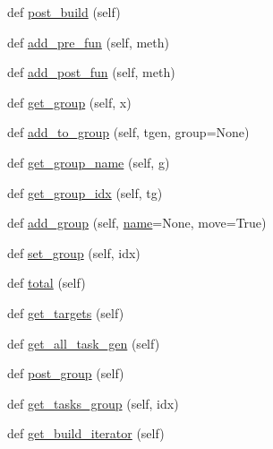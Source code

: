 \begin{DoxyCompactItemize}
\item 
def \hyperlink{classwaflib_1_1_build_1_1_build_context_aa8a25dd6bc5b621fa21d9806525e03df}{post\+\_\+build} (self)
\item 
def \hyperlink{classwaflib_1_1_build_1_1_build_context_a6ebf18db9a2bccd92de1506d261d7f03}{add\+\_\+pre\+\_\+fun} (self, meth)
\item 
def \hyperlink{classwaflib_1_1_build_1_1_build_context_a64d6fb9f73868bc70922fabaa0682fef}{add\+\_\+post\+\_\+fun} (self, meth)
\item 
def \hyperlink{classwaflib_1_1_build_1_1_build_context_ae9d4d76df236217e6c1ba262df1a7376}{get\+\_\+group} (self, x)
\item 
def \hyperlink{classwaflib_1_1_build_1_1_build_context_a4454ed8386bb714afcd240eedc360720}{add\+\_\+to\+\_\+group} (self, tgen, group=None)
\item 
def \hyperlink{classwaflib_1_1_build_1_1_build_context_a70172b57dd578379f3de337a479d1463}{get\+\_\+group\+\_\+name} (self, g)
\item 
def \hyperlink{classwaflib_1_1_build_1_1_build_context_a8b0e6338acd281989d32dd8a1502e745}{get\+\_\+group\+\_\+idx} (self, tg)
\item 
def \hyperlink{classwaflib_1_1_build_1_1_build_context_a9e1a6200ab3e854ecc9041a5e9abaa78}{add\+\_\+group} (self, \hyperlink{lib_2expat_8h_a1b49b495b59f9e73205b69ad1a2965b0}{name}=None, move=True)
\item 
def \hyperlink{classwaflib_1_1_build_1_1_build_context_a00550c82b40990a204a19c29aee9bfe6}{set\+\_\+group} (self, idx)
\item 
def \hyperlink{classwaflib_1_1_build_1_1_build_context_a9242bac9596041fb6e91bd4f7cdbac51}{total} (self)
\item 
def \hyperlink{classwaflib_1_1_build_1_1_build_context_a11f1e63e72833ad88c0d58ffb29342d6}{get\+\_\+targets} (self)
\item 
def \hyperlink{classwaflib_1_1_build_1_1_build_context_a534cef50b471df8c60a8392209465f7f}{get\+\_\+all\+\_\+task\+\_\+gen} (self)
\item 
def \hyperlink{classwaflib_1_1_build_1_1_build_context_ae2c4605b1c701d8421f922205621f9df}{post\+\_\+group} (self)
\item 
def \hyperlink{classwaflib_1_1_build_1_1_build_context_a24789de45b2753c05b4a972ea7788dda}{get\+\_\+tasks\+\_\+group} (self, idx)
\item 
def \hyperlink{classwaflib_1_1_build_1_1_build_context_a7a7c250dce7990bdebc5d1d58047139a}{get\+\_\+build\+\_\+iterator} (self)

\end{DoxyCompactItemize}
